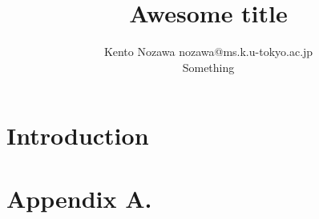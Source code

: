 \documentclass[twoside,11pt]{article}
\begin{document}
\title{Awesome title}

\author{\name Kento Nozawa \email nozawa@ms.k.u-tokyo.ac.jp \\
      \addr Something
}


\maketitle

\begin{abstract} %

\end{abstract}

\begin{keywords}

\end{keywords}

\section{Introduction}

\acks{}

\newpage

\appendix
\section*{Appendix A.}
\label{app:theorem}

\vskip 0.2in

\end{document}
